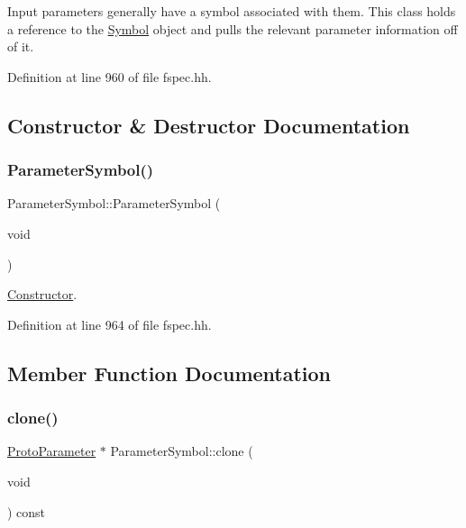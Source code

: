 Input parameters generally have a symbol associated with them. This class holds a reference to the \mbox{\hyperlink{class_symbol}{Symbol}} object and pulls the relevant parameter information off of it. 

Definition at line 960 of file fspec.\+hh.



\subsection{Constructor \& Destructor Documentation}
\mbox{\label{class_parameter_symbol_a918d24c31eef2a92f8af3d5047d97659}} 
\subsubsection{\texorpdfstring{ParameterSymbol()}{ParameterSymbol()}}
{\footnotesize\ttfamily Parameter\+Symbol\+::\+Parameter\+Symbol (\begin{DoxyParamCaption}\item[{void}]{ }\end{DoxyParamCaption})\hspace{0.3cm}{\ttfamily [inline]}}



\mbox{\hyperlink{class_constructor}{Constructor}}. 



Definition at line 964 of file fspec.\+hh.



\subsection{Member Function Documentation}
\mbox{\label{class_parameter_symbol_a53389b2a06d6ee2bd0ece306a70dc360}} 
\subsubsection{\texorpdfstring{clone()}{clone()}}
{\footnotesize\ttfamily \mbox{\hyperlink{class_proto_parameter}{Proto\+Parameter}} $\ast$ Parameter\+Symbol\+::clone (\begin{DoxyParamCaption}\item[{void}]{ }\end{DoxyParamCaption}) const\hspace{0.3cm}{\ttfamily [virtual]}}



